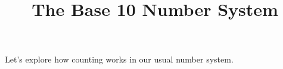 \documentclass{ximera}
\title{The Base 10 Number System}
\begin{document}
\begin{abstract}
\end{abstract}
\maketitle

Let's explore how counting works in our usual number system.
\end{document}
